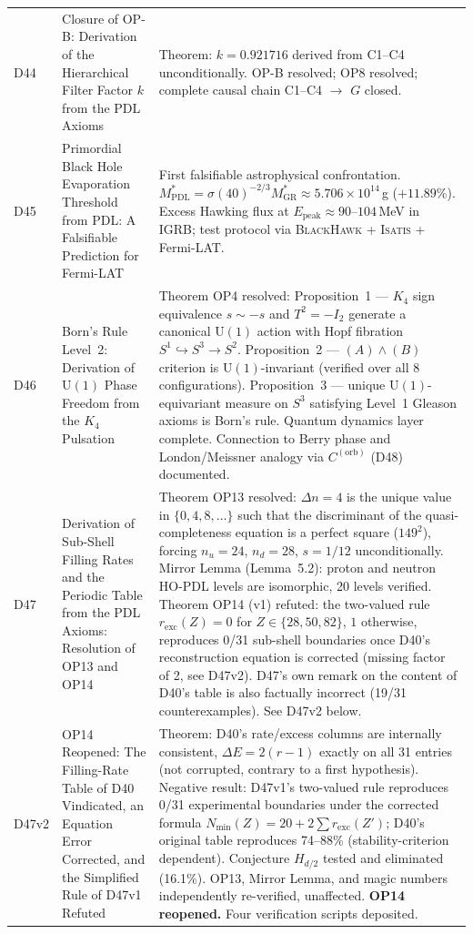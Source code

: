 \documentclass[11pt,a4paper]{article}
\theoremstyle{plain}
\theoremstyle{definition}
\theoremstyle{remark}
\begin{document}
\begin{longtable}{L{1.3cm}L{3.8cm}L{8.0cm}}
D44 & Closure of OP-B: Derivation of the Hierarchical Filter Factor $k$ from the PDL Axioms~\cite{D44} & \textcolor{proofblue}{Theorem}: $k = 0.921716$ derived from C1--C4 unconditionally. OP-B resolved; OP8 resolved; complete causal chain C1--C4 $\to$ $G$ closed.\\[0.4em]
D45 & Primordial Black Hole Evaporation Threshold from PDL: A Falsifiable Prediction for Fermi-LAT~\cite{D45} & First falsifiable astrophysical confrontation. $M^*_{\mathrm{PDL}} = \sigma(40)^{-2/3} M^*_{\mathrm{GR}} \approx 5.706 \times 10^{14}$\,g ($+11.89\%$). Excess Hawking flux at $E_{\mathrm{peak}} \approx 90$--$104$\,MeV in IGRB; test protocol via \textsc{BlackHawk} + \textsc{Isatis} + Fermi-LAT.\\[0.4em]
D46 & Born's Rule Level~2: Derivation of $\mathrm{U}(1)$ Phase Freedom from the $K_4$ Pulsation~\cite{D46} & \textcolor{proofblue}{Theorem} OP4 resolved: Proposition~1 — $K_4$ sign equivalence $s \sim -s$ and $T^2=-I_2$ generate a canonical $\mathrm{U}(1)$ action with Hopf fibration $S^1\hookrightarrow S^3\to S^2$. Proposition~2 — $(A)\wedge(B)$ criterion is $\mathrm{U}(1)$-invariant (verified over all 8 configurations). Proposition~3 — unique $\mathrm{U}(1)$-equivariant measure on $S^3$ satisfying Level~1 Gleason axioms is Born's rule. Quantum dynamics layer complete. Connection to Berry phase and London/Meissner analogy via $C^{(\mathrm{orb})}$ (D48) documented.\\[0.4em]
D47 & Derivation of Sub-Shell Filling Rates and the Periodic Table from the PDL Axioms: Resolution of OP13 and OP14~\cite{D47} & \textcolor{proofblue}{Theorem} OP13 resolved: $\Delta n=4$ is the unique value in $\{0,4,8,\ldots\}$ such that the discriminant of the quasi-completeness equation is a perfect square ($149^2$), forcing $n_u=24$, $n_d=28$, $s=1/12$ unconditionally. Mirror Lemma (Lemma~5.2): proton and neutron HO-PDL levels are isomorphic, 20 levels verified. \textcolor{negativered}{Theorem OP14 (v1) refuted}: the two-valued rule $r_{\mathrm{exc}}(Z)=0$ for $Z\in\{28,50,82\}$, $1$ otherwise, reproduces 0/31 sub-shell boundaries once D40's reconstruction equation is corrected (missing factor of 2, see D47v2). D47's own remark on the content of D40's table is also factually incorrect (19/31 counterexamples). See D47v2 below. \\[0.4em]
D47v2 & OP14 Reopened: The Filling-Rate Table of D40 Vindicated, an Equation Error Corrected, and the Simplified Rule of D47v1 Refuted~\cite{D47v2} & \textcolor{proofblue}{Theorem}: D40's rate/excess columns are internally consistent, $\Delta E=2(r-1)$ exactly on all 31 entries (not corrupted, contrary to a first hypothesis). \textcolor{negativered}{Negative result}: D47v1's two-valued rule reproduces 0/31 experimental boundaries under the corrected formula $N_{\min}(Z)=20+2\sum r_{\mathrm{exc}}(Z')$; D40's original table reproduces 74--88\% (stability-criterion dependent). Conjecture $H_{d/2}$ tested and eliminated (16.1\%). OP13, Mirror Lemma, and magic numbers independently re-verified, unaffected. \textbf{OP14 reopened.} Four verification scripts deposited.\\[0.4em]

\end{longtable}
\end{document}
